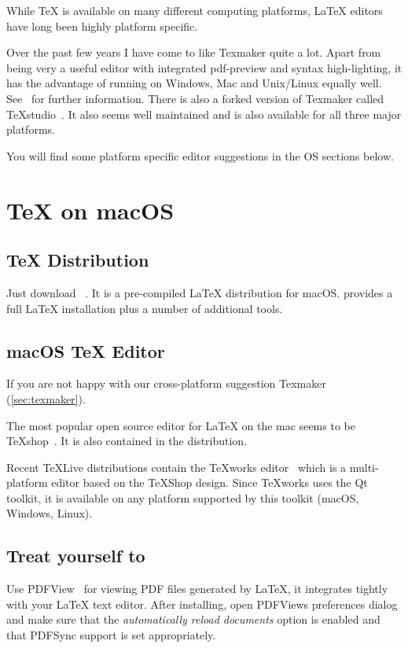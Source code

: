 While \TeX{} is available on many different computing platforms, \LaTeX{}
editors have long been highly platform specific.

Over the past few years I have come to like Texmaker quite a lot.
Apart from being very a useful editor with integrated pdf-preview and syntax
high-lighting, it has the advantage of running on Windows, Mac and
Unix/Linux equally well.  See~\cite{texmaker} for
further information.  There is also a forked version of Texmaker called
TeXstudio~\cite{texstudio}.  It also seems well
maintained and is also available for all three major platforms.

You will find some platform specific editor suggestions in the OS sections
below.

\section{\TeX{} on macOS}

\subsection{\TeX{} Distribution}

Just download ~\cite{mactex}. It is a
pre-compiled \LaTeX{} distribution for macOS\@.  provides a full \LaTeX{}
installation plus a number of additional tools.

\subsection{macOS \TeX{} Editor}

If you are not happy with our cross-platform suggestion Texmaker (\autoref{sec:texmaker}).

The most popular open source editor for \LaTeX{} on the mac seems to be
\TeX{}shop~\cite{texshop}. It
is also contained in the  distribution.

Recent \TeX{}Live distributions contain the \TeX{}works editor~\cite{texworks}
which is a multi-platform editor based on the \TeX{}Shop
design. Since \TeX{}works uses the Qt toolkit, it is available on any platform
supported by this toolkit (macOS, Windows, Linux).

\subsection{Treat yourself to }

Use PDFView~\cite{pdfview} for viewing PDF files generated by \LaTeX{}, it integrates tightly
with your \LaTeX{} text editor. After installing, open
PDFViews preferences dialog and make sure that the \emph{automatically reload
  documents} option is enabled and that PDFSync support is set appropriately.

